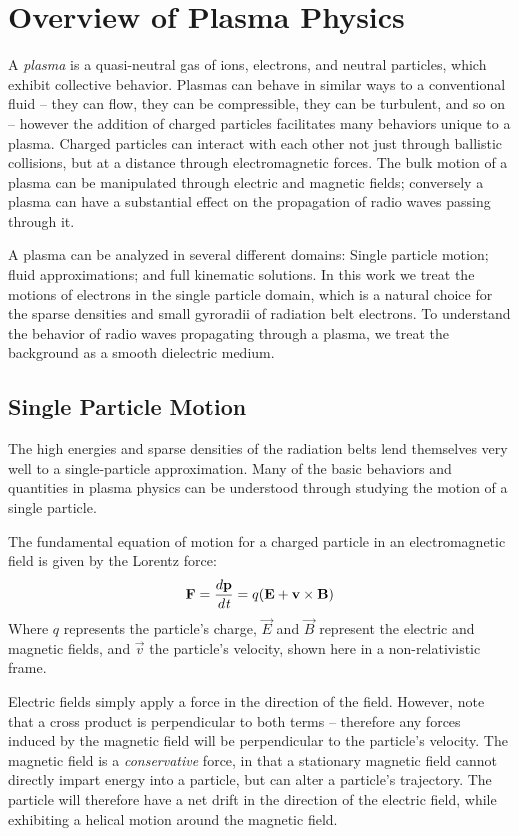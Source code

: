 \section{Overview of Plasma Physics}
A \emph{plasma} is a quasi-neutral gas of ions, electrons, and neutral particles, which exhibit collective behavior. Plasmas can behave in similar ways to a conventional fluid -- they can flow, they can be compressible, they can be turbulent, and so on -- however the addition of charged particles facilitates many behaviors unique to a plasma. Charged particles can interact with each other not just through ballistic collisions, but at a distance through electromagnetic forces. The bulk motion of a plasma can be manipulated through electric and magnetic fields; conversely a plasma can have a substantial effect on the propagation of radio waves passing through it. 

A plasma can be analyzed in several different domains: Single particle motion; fluid approximations; and full kinematic solutions. In this work we treat the motions of electrons in the single particle domain, which is a natural choice for the sparse densities and small gyroradii of radiation belt electrons. To understand the behavior of radio waves propagating through a plasma, we treat the background as a smooth dielectric medium. 

\subsection{Single Particle Motion}
\label{section:single_particle_motion}
The high energies and sparse densities of the radiation belts lend themselves very well to a single-particle approximation. Many of the basic behaviors and quantities in plasma physics can be understood through studying the motion of a single particle.

The fundamental equation of motion for a charged particle in an electromagnetic field is given by the Lorentz force:
\begin{equation}
\vec{F} = \frac{d\vec{p}}{d\emph{t}} = q(\vec{E} + \vec{v}\times\vec{B})
\label{eqn:lorentz_force}
\end{equation}
Where $q$ represents the particle's charge, $\vec{E}$ and $\vec{B}$ represent the electric and magnetic fields, and $\vec{v}$ the particle's velocity, shown here in a non-relativistic frame.

Electric fields simply apply a force in the direction of the field. However, note that a cross product is perpendicular to both terms -- therefore any forces induced by the magnetic field will be perpendicular to the particle's velocity. The magnetic field is a \emph{conservative} force, in that a stationary magnetic field cannot directly impart energy into a particle, but can alter a particle's trajectory. The particle will therefore have a net drift in the direction of the electric field, while exhibiting a helical motion around the magnetic field.


